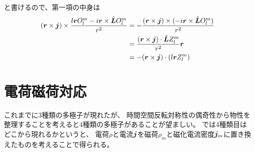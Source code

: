 \documentclass[../../master.tex]{subfiles}
\begin{document}
と書けるので、第一項の中身は
\begin{align}
    (\vb*{r}\times\vb*{j})\times\frac{l\vb*{r}O_l^m-i\vb*{r}\times \hat{\vb*{L}}O_l^m}{r^2}
    &=-\frac{(\vb*{r}\times\vb*{j})\times(-i\vb*{r}\times\hat{\vb*{L}}O_l^m)}{r^2}\\
    &= \frac{(\vb*{r}\times\vb*{j})\cdot\hat{\vb*{L}}Z_l^m}{r^2}\vb*{r}\\
    &=-(\vb*{r}\times \vb*{j})\cdot(l\vb*{r}Z_l^m)
\end{align}


\clearpage
\section{電荷磁荷対応}
これまでに3種類の多極子が現れたが、
時間空間反転対称性の偶奇性から物性を整理することを考えると4種類の多極子があることが望ましい。
では4種類目はどこから現れるかというと、
電荷\(\rho\)と電流\(\vb*{j}\)を磁荷\(\rho_m\)と磁化電流密度\(\vb*{j}_m\)に置き換えたものを考えることで得られる。
\end{document}
